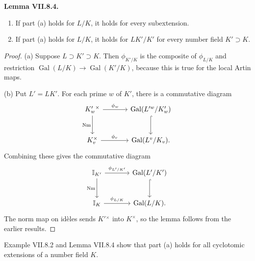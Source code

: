 \documentclass[11pt]{article}
\newcommand{\I}{\mathbb I}
\newcommand{\Nm}{\operatorname{Nm}}
\newcommand{\Gal}{\operatorname{Gal}}
\newenvironment{authorresult}[2]{\par\medskip\noindent\textbf{#1 VII.#2.}\ \itshape}{\par\medskip}
\begin{document}
\begin{authorresult}{Lemma}{8.4}
\begin{enumerate}
\item[(a)] If part (a) holds for $L/K$, it holds for every subextension.
\item[(b)] If part (a) holds for $L/K$, it holds for $LK'/K'$ for every
number field $K'\supset K$.
\end{enumerate}
\end{authorresult}
\begin{proof}
(a) Suppose $L\supset K'\supset K$. Then $\phi_{K'/K}$ is the composite of
$\phi_{L/K}$ and restriction $\Gal(L/K)\to\Gal(K'/K)$, because this is
true for the local Artin maps.

(b) Put $L'=LK'$. For each prime $w$ of $K'$, there is a commutative diagram
\[
\begin{tikzcd}[column sep=large,row sep=large]
K_w'{}^\times\arrow[r,"\phi_w"]\arrow[d,"\Nm"']&
\Gal(L'^w/K'_w)\arrow[d,hook]\\
K_v^\times\arrow[r,"\phi_v"]&\Gal(L^v/K_v).
\end{tikzcd}
\]
Combining these gives the commutative diagram
\[
\begin{tikzcd}[column sep=large,row sep=large]
\I_{K'}\arrow[r,"\phi_{L'/K'}"]\arrow[d,"\Nm"']&
\Gal(L'/K')\arrow[d,hook]\\
\I_K\arrow[r,"\phi_{L/K}"]&\Gal(L/K).
\end{tikzcd}
\]
The norm map on id\`eles sends $K'{}^\times$ into $K^\times$, so the lemma
follows from the earlier results.
\end{proof}
Example VII.8.2 and Lemma VII.8.4 show that part (a) holds for all
cyclotomic extensions of a number field $K$.

\end{document}
